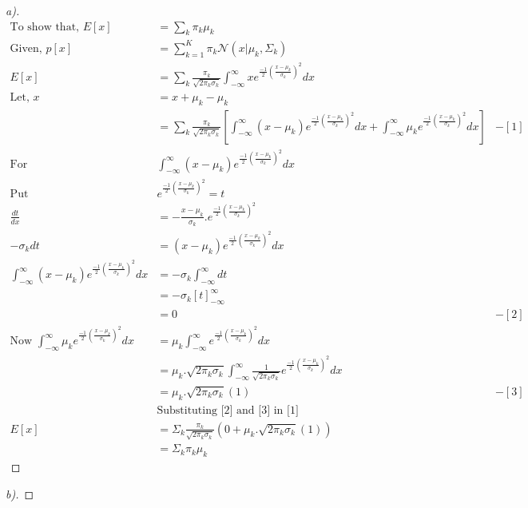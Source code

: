 \documentclass[12pt]{article}
\newenvironment{theorem}[2][Theorem]{\begin{trivlist}
\item[\hskip \labelsep {\bfseries #1}\hskip \labelsep {\bfseries #2.}]}{\end{trivlist}}
\begin{document}
\pagebreak
\begin{theorem}[Ans]{7}
\begin{proof}[a)]
\begin{align*}
\text{To show that, }E[x] &= \sum_{k}\pi_{k}\mu_{k} \\
\text{Given, }p[x] &= \sum_{k=1}^{K}\pi_{k}\mathcal{N}(x|\mu_{k},\Sigma_{k})\\
E[x] &= \sum_{k}\frac{\pi_{k}}{\sqrt{2\pi_{k}\sigma_{k}}}\int_{-\infty}^{\infty}xe^{\frac{-1}{2}(\frac{x-\mu_{k}}{\sigma_{k}})^{2}}dx\\
\text{Let, }x&=x+\mu_{k}-\mu_{k}\\
&=\sum_{k}\frac{\pi_{k}}{\sqrt{2\pi_{k}\sigma_{k}}}[\int_{-\infty}^{\infty}(x-\mu_{k})e^{\frac{-1}{2}(\frac{x-\mu_{k}}{\sigma_{k}})^{2}}dx+\int_{-\infty}^{\infty}\mu_{k}e^{\frac{-1}{2}(\frac{x-\mu_{k}}{\sigma_{k}})^{2}}dx] &- [1]\\
\text{For }&\int_{-\infty}^{\infty}(x-\mu_{k})e^{\frac{-1}{2}(\frac{x-\mu_{k}}{\sigma_{k}})^{2}}dx\\
\text{Put }& e^{\frac{-1}{2}(\frac{x-\mu_{k}}{\sigma_{k}})^{2}}=t\\
\frac{dt}{dx} &= -\frac{x-\mu_{k}}{\sigma_{k}}.e^{\frac{-1}{2}(\frac{x-\mu_{k}}{\sigma_{k}})^{2}} \\
-\sigma_{k}dt &= (x-\mu_{k})e^{\frac{-1}{2}(\frac{x-\mu_{k}}{\sigma_{k}})^{2}}dx\\
\int_{-\infty}^{\infty}(x-\mu_{k})e^{\frac{-1}{2}(\frac{x-\mu_{k}}{\sigma_{k}})^{2}}dx &= -\sigma_{k}\int_{-\infty}^{\infty}dt\\
&= -\sigma_{k}[t]_{-\infty}^{\infty}\\
&= 0 &- [2]\\
\text{Now }\int_{-\infty}^{\infty}\mu_{k}e^{\frac{-1}{2}(\frac{x-\mu_{k}}{\sigma_{k}})^{2}}dx&= \mu_{k}\int_{-\infty}^{\infty}e^{\frac{-1}{2}(\frac{x-\mu_{k}}{\sigma_{k}})^{2}}dx\\
&=\mu_{k}.\sqrt{2\pi_{k}\sigma_{k}}\int_{-\infty}^{\infty}\frac{1}{\sqrt{2\pi_{k}\sigma_{k}}}e^{\frac{-1}{2}(\frac{x-\mu_{k}}{\sigma_{k}})^{2}}dx\\
&=\mu_{k}.\sqrt{2\pi_{k}\sigma_{k}}(1) & -[3]\\
&\text{Substituting [2] and [3] in [1]}\\
E[x]&=\Sigma_{k}\frac{\pi_{k}}{\sqrt{2\pi_{k}\sigma_{k}}}(0+\mu_{k}.\sqrt{2\pi_{k}\sigma_{k}}(1))\\
&=\Sigma_{k}\pi_{k}\mu_{k}
\end{align*}
\end{proof}
\begin{proof}[b)]

\end{proof}
\end{theorem}
\end{document}
